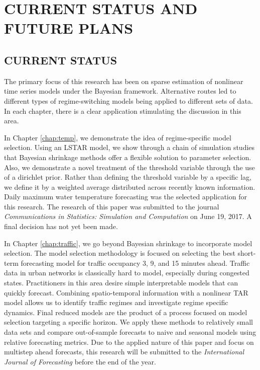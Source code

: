 \chapter{CURRENT STATUS AND FUTURE PLANS}

\section{CURRENT STATUS}

The primary focus of this research has been on sparse estimation of nonlinear time series models under the Bayesian framework.  Alternative routes led to different types of regime-switching models being applied to different sets of data. In each chapter, there is a clear application stimulating the discussion in this area. 

In Chapter \ref{chap:temp}, we demonstrate the idea of regime-specific model selection. Using an LSTAR model, we show through a chain of simulation studies that Bayesian shrinkage methods offer a flexible solution to parameter selection. Also, we demonstrate a novel treatment of the threshold variable through the use of a dirichlet prior. Rather than defining the threshold variable by a specific lag, we define it by a weighted average distributed across recently known information. Daily maximum water temperature forecasting was the selected application for this research. The research of this paper was submitted to the journal \textit{Communications in Statistics: Simulation and Computation} on June 19, 2017. A final decision has not yet been made.

In Chapter \ref{chap:traffic}, we go beyond Bayesian shrinkage to incorporate model selection. The model selection methodology is focused on selecting the best short-term forecasting model for traffic occupancy 3, 9, and 15 minutes ahead. Traffic data in urban networks is classically hard to model, especially during congested states. Practitioners in this area desire simple interpretable models that can quickly forecast. Combining spatio-temporal information with a nonlinear TAR model allows us to identify traffic regimes and investigate regime specific dynamics. Final reduced models are the product of a process focused on model selection targeting a specific horizon. We apply these methods to relatively small data sets and compare out-of-sample forecasts to naive and seasonal models using relative forecasting metrics. Due to the applied nature of this paper and focus on multistep ahead forecasts,  this research will be submitted to the \textit{International Journal of Forecasting} before the end of the year. 


